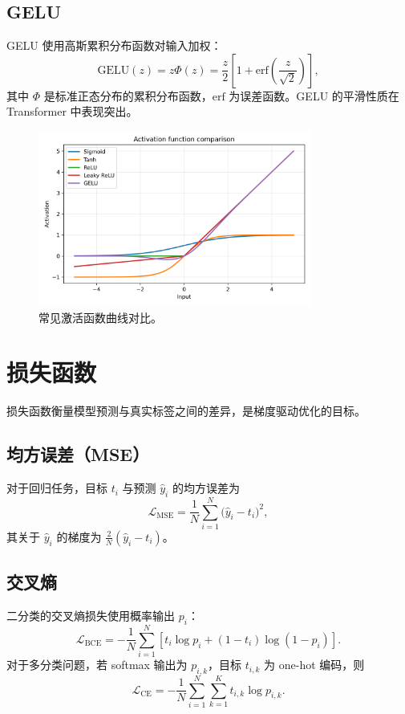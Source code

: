 ﻿\documentclass{ctexart}
\begin{document}
\subsection{GELU}
GELU 使用高斯累积分布函数对输入加权：
\begin{equation}
  \mathrm{GELU}(z) = z \Phi(z) = \frac{z}{2}\left[1 + \mathrm{erf}\left(\frac{z}{\sqrt{2}}\right)\right],
\end{equation}
其中 $\Phi$ 是标准正态分布的累积分布函数，$\mathrm{erf}$ 为误差函数。GELU 的平滑性质在 Transformer 中表现突出。

\begin{figure}[H]
  \centering
  \includegraphics[width=0.8\textwidth]{activation_functions.png}
  \caption{常见激活函数曲线对比。}
  \label{fig:activation_functions}
\end{figure}
\FloatBarrier

\section{损失函数}
损失函数衡量模型预测与真实标签之间的差异，是梯度驱动优化的目标。

\subsection{均方误差（MSE）}
对于回归任务，目标 $t_i$ 与预测 $\hat{y}_i$ 的均方误差为
\begin{equation}
  \mathcal{L}_{\mathrm{MSE}} = \frac{1}{N} \sum_{i=1}^{N} \bigl(\hat{y}_i - t_i\bigr)^2,
\end{equation}
其关于 $\hat{y}_i$ 的梯度为 $\frac{2}{N}(\hat{y}_i - t_i)$。

\subsection{交叉熵}
二分类的交叉熵损失使用概率输出 $p_i$：
\begin{equation}
  \mathcal{L}_{\mathrm{BCE}} = -\frac{1}{N} \sum_{i=1}^{N} \left[t_i \log p_i + (1-t_i) \log(1-p_i)\right].
\end{equation}
对于多分类问题，若 softmax 输出为 $p_{i,k}$，目标 $t_{i,k}$ 为 one-hot 编码，则
\begin{equation}
  \mathcal{L}_{\mathrm{CE}} = -\frac{1}{N} \sum_{i=1}^{N} \sum_{k=1}^{K} t_{i,k} \log p_{i,k}.
\end{equation}
\end{document}
